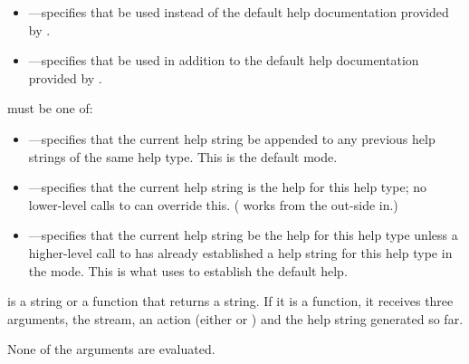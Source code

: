 \begin{itemize}
\item {}---specifies that  be used instead of
the default help documentation provided by .

\item {}---specifies that  be used in addition to
the default help documentation provided by .
\end{itemize}

 must be one of:

\begin{itemize}
\item {}---specifies that the current help string be appended to any
previous help strings of the same help type. This is the default mode.

\item {}---specifies that the current help string is the help for
this help type; no lower-level calls to  can override this.
( works from the out-side in.)

\item {}---specifies that the current help string
be the help for this help type unless a higher-level call to
 has already established a help string for this help type
in the  mode. This is what  uses to establish the
default help.
\end{itemize}

 is a string or a function that returns a string.  If it is a
function, it receives three arguments, the stream, an action (either 
or ) and the help string generated so far.

None of the arguments are evaluated. 
